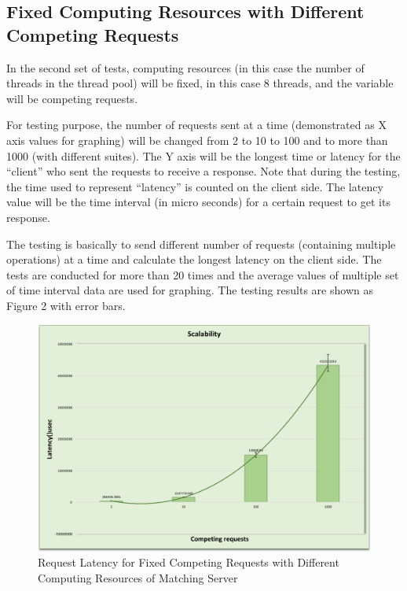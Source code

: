 \documentclass{article}
\begin{document}
\subsection{Fixed Computing Resources with Different Competing Requests}
In the second set of tests, computing resources (in this case the number of threads in the thread pool) will be fixed, in this case 8 threads, and the variable will be competing requests.\vspace{\baselineskip}

For testing purpose, the number of requests sent at a time (demonstrated as X axis values for graphing) will be changed from 2 to 10 to 100 and to more than 1000 (with different suites). The Y axis will be the longest time or latency for the “client” who sent the requests to receive a response. Note that during the testing, the time used to represent “latency” is counted on the client side. The latency value will be the time interval (in micro seconds) for a certain request to get its response.\vspace{\baselineskip}

The testing is basically to send different number of requests (containing multiple operations) at a time and calculate the longest latency on the client side. The tests are conducted for more than 20 times and the average values of multiple set of time interval data are used for graphing. The testing results are shown as Figure 2 with error bars.

\begin{figure}[h!]
\centering
\includegraphics[scale=0.3]{ece5901.png}
\caption{Request Latency for Fixed Competing Requests with Different Computing Resources of Matching Server}
\label{fig:}
\end{figure}
\end{document}
